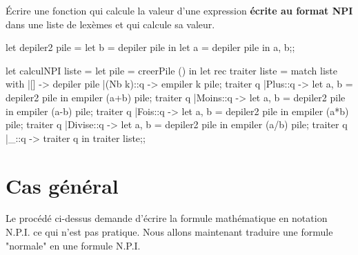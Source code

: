 \begin{question}{}{}
Écrire une fonction  qui calcule la valeur d'une expression {\bf écrite au format NPI} dans une liste de lexèmes et qui calcule sa valeur.

\reponse

\begin{ocaml}
let depiler2 pile =
    let b = depiler pile in
    let a = depiler pile in
    a, b;;

let calculNPI liste =
   let pile = creerPile () in
   let rec traiter liste =
      match liste with
      |[] -> depiler pile
      |(Nb k)::q -> empiler k pile;
                    traiter q
      |Plus::q -> let a, b = depiler2 pile in 
                  empiler (a+b) pile;
                  traiter q 
      |Moins::q -> let a, b = depiler2 pile in 
                   empiler (a-b) pile;
                   traiter q
      |Fois::q -> let a, b = depiler2 pile in 
                  empiler (a*b) pile;
                  traiter q
      |Divise::q -> let a, b = depiler2 pile in 
                    empiler (a/b) pile;
                    traiter q
       |_::q -> traiter q  in   
   traiter liste;;        
\end{ocaml}

\end{question}
\newpage
\section{Cas général}
Le procédé ci-dessus demande d'écrire la formule mathématique en notation N.P.I. ce qui n'est pas pratique. Nous allons maintenant traduire une formule "normale" en une formule N.P.I.


